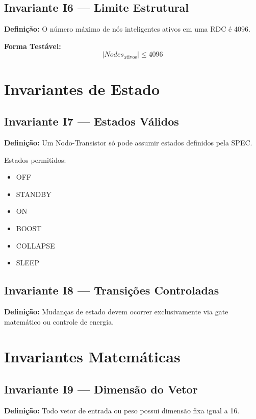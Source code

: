 \documentclass[12pt,a4paper]{article}
\begin{document}
	\subsection{Invariante I6 — Limite Estrutural}
	
	\textbf{Definição:}  
	O número máximo de nós inteligentes ativos em uma RDC é 4096.
	
	\textbf{Forma Testável:}
	\[
	|Nodes_{\text{ativos}}| \leq 4096
	\]
	
	\section{Invariantes de Estado}
	
	\subsection{Invariante I7 — Estados Válidos}
	
	\textbf{Definição:}  
	Um Nodo-Transistor só pode assumir estados definidos pela SPEC.
	
	Estados permitidos:
	\begin{itemize}
		\item OFF
		\item STANDBY
		\item ON
		\item BOOST
		\item COLLAPSE
		\item SLEEP
	\end{itemize}
	
	\subsection{Invariante I8 — Transições Controladas}
	
	\textbf{Definição:}  
	Mudanças de estado devem ocorrer exclusivamente via gate matemático
	ou controle de energia.
	
	\section{Invariantes Matemáticas}
	
	\subsection{Invariante I9 — Dimensão do Vetor}
	
	\textbf{Definição:}  
	Todo vetor de entrada ou peso possui dimensão fixa igual a 16.
	
\end{document}
